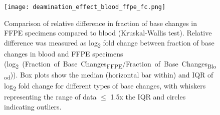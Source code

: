 
\begin{figure}[H]
	\centering
	\texttt{[image: deamination\_effect\_blood\_ffpe\_fc.png]}
	\caption[Comparison of relative difference in fraction of base changes in FFPE specimens compared to blood (Kruskal-Wallis test).]{Comparison of relative difference in fraction of base changes in FFPE specimens compared to blood (Kruskal-Wallis test). Relative difference was measured as log\textsubscript{2} fold change between fraction of base changes in blood and FFPE specimens \mbox{(log\textsubscript{2} (Fraction of Base Changes\textsubscript{FFPE}/Fraction of Base Changes\textsubscript{Blood}))}. Box plots show the median (horizontal bar within) and IQR of log\textsubscript{2} fold change for different types of base changes, with whiskers representing the range of data $\leq$ 1.5x the IQR and circles indicating outliers.}
	\label{fig:deamination_effect_blood_ffpe_fc}
\end{figure}


